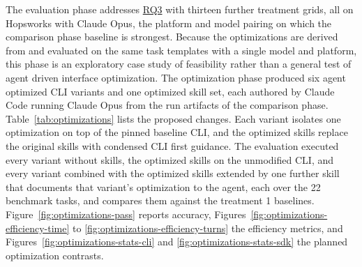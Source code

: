 \documentclass[
english,                 %
bibtex,                  %
]{kththesis}
\numberwithin{listing}{chapter}
\begin{document}
The evaluation phase addresses \hyperref[rq3]{RQ3} with thirteen further treatment grids, all on Hopsworks with Claude Opus, the platform and model pairing on which the comparison phase baseline is strongest. Because the optimizations are derived from and evaluated on the same task templates with a single model and platform, this phase is an exploratory case study of feasibility rather than a general test of agent driven interface optimization. The optimization phase produced six agent optimized \gls{CLI} variants and one optimized skill set, each authored by Claude Code running Claude Opus from the run artifacts of the comparison phase. Table~\ref{tab:optimizations} lists the proposed changes. Each variant isolates one optimization on top of the pinned baseline \gls{CLI}, and the optimized skills replace the original skills with condensed \gls{CLI} first guidance. The evaluation executed every variant without skills, the optimized skills on the unmodified \gls{CLI}, and every variant combined with the optimized skills extended by one further skill that documents that variant's optimization to the agent, each over the 22 benchmark tasks, and compares them against the treatment 1 baselines. Figure~\ref{fig:optimizations-pass} reports accuracy, Figures~\ref{fig:optimizations-efficiency-time} to \ref{fig:optimizations-efficiency-turns} the efficiency metrics, and Figures~\ref{fig:optimizations-stats-cli} and \ref{fig:optimizations-stats-sdk} the planned optimization contrasts.
\end{document}
